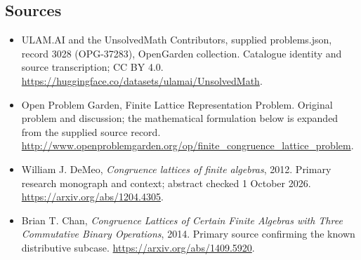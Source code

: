 \documentclass[11pt,a4paper]{article}
\begin{document}
\subsection{Sources}
\begin{itemize}
\item[S1] ULAM.AI and the UnsolvedMath Contributors, supplied problems.json, record 3028 (OPG-37283), OpenGarden collection. Catalogue identity and source transcription; CC BY 4.0.
\url{https://huggingface.co/datasets/ulamai/UnsolvedMath}.
\item[S2] Open Problem Garden, Finite Lattice Representation Problem. Original problem and discussion; the mathematical formulation below is expanded from the supplied source record.
\url{http://www.openproblemgarden.org/op/finite_congruence_lattice_problem}.

\item[R1] William J. DeMeo, \emph{Congruence lattices of finite algebras},
2012. Primary research monograph and context; abstract checked 1 October 2026.
\url{https://arxiv.org/abs/1204.4305}.
\item[R2] Brian T. Chan, \emph{Congruence Lattices of Certain Finite
Algebras with Three Commutative Binary Operations}, 2014. Primary
source confirming the known distributive subcase.
\url{https://arxiv.org/abs/1409.5920}.

\end{itemize}
\end{document}

